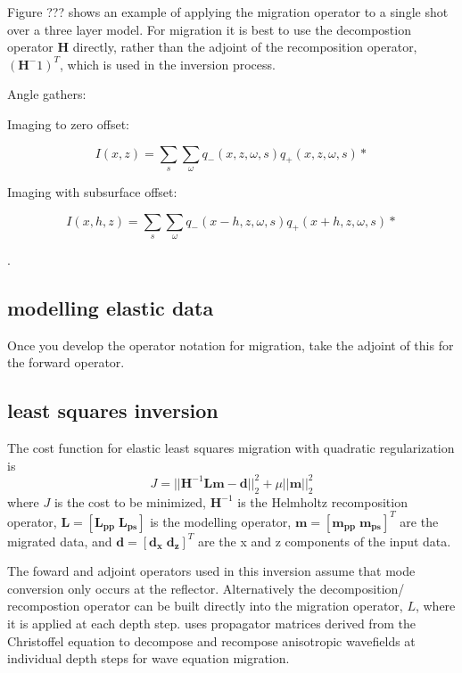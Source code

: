 Figure ??? shows an example of applying the migration operator to a single shot over a three layer model. For migration it is best to use the decompostion operator $\mathbf{H}$ directly, rather than the adjoint of the recomposition operator, $(\mathbf{H}^-1)^T$, which is used in the inversion process.

Angle gathers: 

Imaging to zero offset:

\begin{equation}
I(x,z) = \sum _s \sum _\omega q_-(x,z,\omega,s) q_+(x,z,\omega,s)*  
\end{equation}

Imaging with subsurface offset:

\begin{equation}
I(x,h,z) = \sum _s \sum _\omega q_-(x-h,z,\omega,s) q_+(x+h,z,\omega,s)*  
\end{equation}

\citep{rickett2002offset}.


\subsection{modelling elastic data}

Once you develop the operator notation for migration, take the adjoint of this for the forward operator.



\subsection{least squares inversion}


The cost function for elastic least squares migration with quadratic regularization is
\begin{equation}
J = || \mathbf{H}^{-1}\mathbf{L}\mathbf{m} - \mathbf{d} ||^2_2 + \mu ||\mathbf{m}||^2_2
\end{equation}
where $J$ is the cost to be minimized, $\mathbf{H}^{-1}$ is the Helmholtz recomposition operator, $\mathbf{L} = [\mathbf{L_{pp}} \; \mathbf{L_{ps}}]$ is the modelling operator, $\mathbf{m}=[\mathbf{m_{pp}} \; \mathbf{m_{ps}}]^T$ are the migrated data, and $\mathbf{d}=[\mathbf{d_{x}} \; \mathbf{d_{z}}]^T$ are the x and z components of the input data.

The foward and adjoint operators used in this inversion assume that mode conversion only occurs at the reflector. Alternatively the decomposition/ recompostion operator can be built directly into the migration operator, $L$, where it is applied at each depth step. \cite{bale2006} uses propagator matrices derived from the Christoffel equation to decompose and recompose anisotropic wavefields at individual depth steps for wave equation migration.

